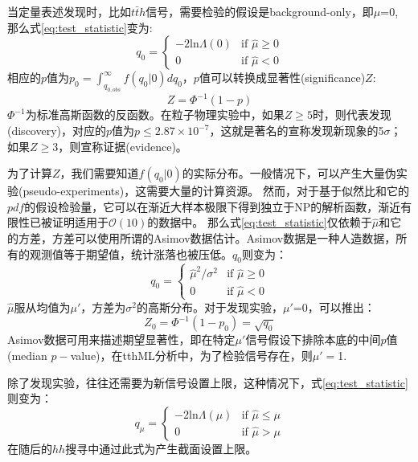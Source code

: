  当定量表述发现时，比如$t\bar{t}h$信号，需要检验的假设是background-only，即$\mu$=0, 那么式\ref{eq:test_statistic}变为:
\begin{equation}
 q_0=
 \begin{cases}
  -2\text{ln}\Lambda(0) & \text{if $\hat{\mu} \geq 0$} \\
  0  & \text{if $\hat{\mu} <$0}
 \end{cases}
\end{equation}
相应的$p$值为$p_0=\int_{q_{0,obs}}^\infty f(q_0|0)dq_0$，$p$值可以转换成显著性(significance)$Z$:
\begin{equation}
 Z=\Phi^{-1}(1-p)
\end{equation}
$\Phi^{-1}$为标准高斯函数的反函数。在粒子物理实验中，如果$Z \geq 5$时，则代表发现(discovery)，对应的$p$值为$p \leq 2.87\times 10^{-7}$，这就是著名的宣称发现新现象的5$\sigma$；
如果$Z \geq 3$，则宣称证据(evidence)。

为了计算$Z$，我们需要知道$f(q_0|0)$的实际分布。一般情况下，可以产生大量伪实验(pseudo-experiments)，这需要大量的计算资源。
然而，对于基于似然比和它的$pdf$的假设检验量，它可以在渐近大样本极限下得到独立于NP的解析函数，渐近有限性已被证明适用于$\mathcal{O}(10)$的数据中。
那么式\ref{eq:test_statistic}仅依赖于$\hat{\mu}$和它的方差，方差可以使用所谓的Asimov数据估计。Asimov数据是一种人造数据，所有的观测值等于期望值，统计涨落也被压低。$q_0$则变为：
\begin{equation}
 q_0=
 \begin{cases}
   {\hat{\mu}}^2/\sigma^2 & \text{if $\hat{\mu} \geq 0$} \\
   0  & \text{if $\hat{\mu}< 0$}
 \end{cases}
\end{equation}
 $\hat{\mu}$服从均值为$\mu{\prime}$，方差为$\sigma ^2$的高斯分布。对于发现实验，$\mu{\prime}$=0，可以推出：
 \begin{equation}
  Z_0=\Phi^{-1}(1-p_0)=\sqrt{q_0}
 \end{equation}
 Asimov数据可用来描述期望显著性，即在特定$\mu\prime$信号假设下排除本底的中间$p$值(median $p-$value)，在tthML分析中，为了检验信号存在，则$\mu{\prime}=$1.
 
 除了发现实验，往往还需要为新信号设置上限，这种情况下，式\ref{eq:test_statistic}则变为：
 \begin{equation}
 q_ \mu=
 \begin{cases}
  -2\text{ln}\Lambda(\mu) & \text{if $\hat{\mu} \leq \mu$} \\
  0  & \text{if $\hat{\mu} > \mu$}
 \end{cases}
\end{equation}
在随后的$hh$搜寻中通过此式为产生截面设置上限。

